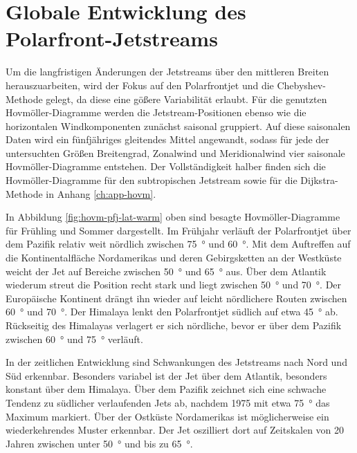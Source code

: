 \section{Globale Entwicklung des Polarfront-Jetstreams}
Um die langfristigen Änderungen der Jetstreams über den mittleren Breiten herauszuarbeiten, wird der Fokus auf den Polarfrontjet und die Cheby\-shev-Methode gelegt, da diese eine gößere Variabilität erlaubt. Für die genutzten Hovmöller-Diagramme werden die Jetstream-Positionen ebenso wie die horizontalen Windkomponenten zunächst saisonal gruppiert. Auf diese saisonalen Daten wird ein fünfjähriges gleitendes Mittel angewandt, sodass für jede der untersuchten Größen Breitengrad, Zonalwind und Meridionalwind vier saisonale Hovmöller-Diagramme entstehen. Der Vollständigkeit halber finden sich die Hovmöller-Diagramme für den subtropischen Jetstream sowie für die Dijkstra-Methode in Anhang \ref{ch:app-hovm}.

In Abbildung \ref{fig:hovm-pfj-lat-warm} oben sind besagte Hovmöller-Diagramme für Frühling und Sommer dargestellt. Im Frühjahr verläuft der Polarfrontjet über dem Pazifik relativ weit nördlich zwischen \SI{75}{\degree} und \SI{60}{\degree}. Mit dem Auftreffen auf die Kontinentalfläche Nordamerikas und deren Gebirgsketten an der Westküste weicht der Jet auf Bereiche zwischen \SI{50}{\degree} und \SI{65}{\degree} aus. Über dem Atlantik wiederum streut die Position recht stark und liegt zwischen \SI{50}{\degree} und \SI{70}{\degree}. Der Europäische Kontinent drängt ihn wieder auf leicht nördlichere Routen zwischen \SI{60}{\degree} und \SI{70}{\degree}. Der Himalaya lenkt den Polarfrontjet südlich auf etwa \SI{45}{\degree} ab. Rückseitig des Himalayas verlagert er sich nördliche, bevor er über dem Pazifik zwischen \SI{60}{\degree} und \SI{75}{\degree} verläuft.

In der zeitlichen Entwicklung sind Schwankungen des Jetstreams nach Nord und Süd erkennbar. Besonders variabel ist der Jet über dem Atlantik, besonders konstant über dem Himalaya. Über dem Pazifik zeichnet sich eine schwache Tendenz zu südlicher verlaufenden Jets ab, nachdem 1975 mit etwa \SI{75}{\degree} das Maximum markiert. Über der Ostküste Nordamerikas ist möglicherweise ein wiederkehrendes Muster erkennbar. Der Jet oszilliert dort auf Zeitskalen von 20\,Jahren zwischen unter \SI{50}{\degree} und bis zu \SI{65}{\degree}.

